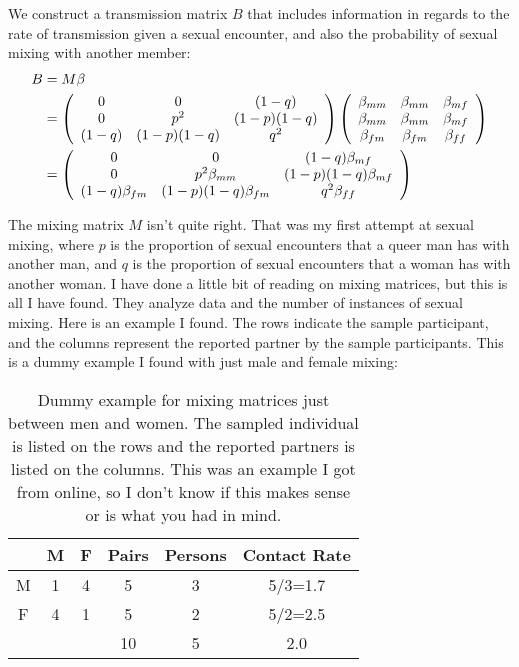 \documentclass[12pt]{article}
\begin{document}
We construct a transmission matrix $B$ that includes information in regards to the rate of transmission given a sexual encounter, and also the probability of sexual mixing with another member:
\begin{align}
B&=M\beta\\
&=\left(\begin{array}{c c c}
0 & 0 & (1-q) \\
0 & p^2 & (1-p)(1-q) \\
(1-q) & (1-p)(1-q) & q^2
\end{array}\right)\left(\begin{array}{c c c}
\beta_{mm} & \beta_{mm} & \beta_{mf}\\
\beta_{mm} & \beta_{mm} & \beta_{mf}\\
\beta_{fm} & \beta_{fm} & \beta_{ff}
\end{array}\right)\\
&=\left(\begin{array}{c c c}
0 & 0 & (1-q)\beta_{mf} \\
0 & p^2\beta_{mm} & (1-p)(1-q)\beta_{mf}\\
(1-q)\beta_{fm} & (1-p)(1-q)\beta_{fm} & q^2\beta_{ff} 
\end{array}\right)
\end{align}

The mixing matrix $M$ isn't quite right.  That was my first attempt at sexual mixing, where $p$ is the proportion of sexual encounters that a queer man has with another man, and $q$ is the proportion of sexual encounters that a woman has with another woman.  I have done a little bit of reading on mixing matrices, but this is all I have found.  They analyze data and the number of instances of sexual mixing.  Here is an example I found.  The rows indicate the sample participant, and the columns represent the reported partner by the sample participants.  This is a dummy example I found with just male and female mixing:
\begin{table}[h!]
\begin{center}
\begin{tabular} {c |c | c |  c c c }
 & M & F & Pairs & Persons & Contact Rate\\
 \hline
 M & 1 & 4 & 5 & 3 & 5/3=1.7\\
 \hline
 F & 4 & 1 & 5 & 2 & 5/2=2.5\\
 \hline
 & & & 10 & 5 & 2.0
\end{tabular}
\caption{Dummy example for mixing matrices just between men and women.  The sampled individual is listed on the rows and the reported partners is listed on the columns.  This was an example I got from online, so I don't know if this makes sense or is what you had in mind.}
\end{center}
\end{table}
\end{document}
